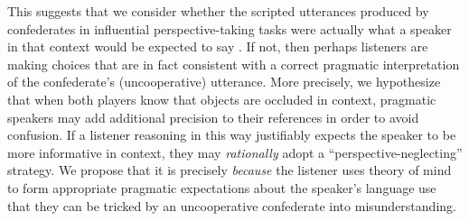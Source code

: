 \documentclass[manuscript]{stjour}
\begin{document}
This suggests that we consider whether the scripted utterances produced by  confederates in influential perspective-taking tasks were actually what a speaker in that context would be expected to say \citep{KuhlenBrennan13_LanguageInDialogue}. 
If not, then perhaps listeners are making choices that are in fact consistent with a correct pragmatic interpretation of the confederate's (uncooperative) utterance.
More precisely, we hypothesize that when both players know that objects are occluded in context, pragmatic speakers may add additional precision to their references in order to avoid confusion. 
If a listener reasoning in this way justifiably expects the speaker to be more informative in context, they may \emph{rationally} adopt a ``perspective-neglecting'' strategy. %
We propose that it is precisely \emph{because} the listener uses theory of mind to form appropriate pragmatic expectations about the speaker's language use that they can be tricked by an uncooperative confederate into misunderstanding. 
%
\end{document}
